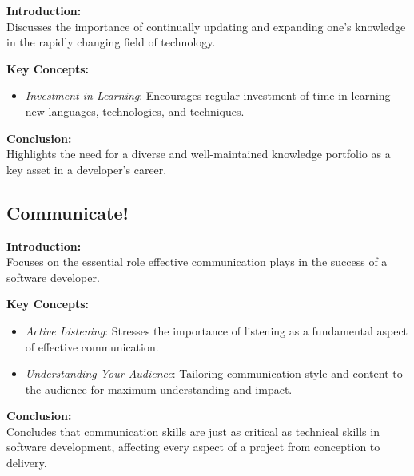 \textbf{Introduction:} \\
Discusses the importance of continually updating and expanding one's knowledge in the rapidly changing field of technology.

\vspace{2mm}
\noindent\textbf{Key Concepts:}
\begin{itemize}
  \item \textit{Investment in Learning}: Encourages regular investment of time in learning new languages, technologies, and techniques.
\end{itemize}

\vspace{2mm}
\noindent\textbf{Conclusion:} \\
Highlights the need for a diverse and well-maintained knowledge portfolio as a key asset in a developer's career.

\subsection{Communicate!}

\textbf{Introduction:} \\
Focuses on the essential role effective communication plays in the success of a software developer.

\vspace{2mm}
\noindent\textbf{Key Concepts:}
\begin{itemize}
  \item \textit{Active Listening}: Stresses the importance of listening as a fundamental aspect of effective communication.
  \item \textit{Understanding Your Audience}: Tailoring communication style and content to the audience for maximum understanding and impact.
\end{itemize}

\vspace{2mm}
\noindent\textbf{Conclusion:} \\
Concludes that communication skills are just as critical as technical skills in software development, affecting every aspect of a project from conception to delivery.
